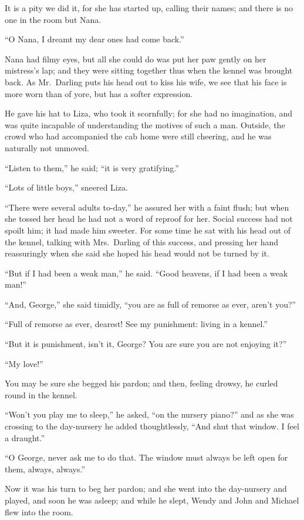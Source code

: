It is a pity we did it, for she has started up, calling their names;
and there is no one in the room but Nana.

``O Nana, I dreamt my dear ones had come back.''

Nana had filmy eyes, but all she could do was put her paw gently on her
mistress's lap; and they were sitting together thus when the kennel was
brought back. As Mr.\ Darling puts his head out to kiss his wife, we see
that his face is more worn than of yore, but has a softer expression.

He gave his hat to Liza, who took it scornfully; for she had no
imagination, and was quite incapable of understanding the motives of
such a man. Outside, the crowd who had accompanied the cab home were
still cheering, and he was naturally not unmoved.

``Listen to them,'' he said; ``it is very gratifying.''

``Lots of little boys,'' sneered Liza.

``There were several adults to-day,'' he assured her with a faint flush;
but when she tossed her head he had not a word of reproof for her.
Social success had not spoilt him; it had made him sweeter. For some
time he sat with his head out of the kennel, talking with Mrs.\ Darling
of this success, and pressing her hand reassuringly when she said she
hoped his head would not be turned by it.

``But if I had been a weak man,'' he said. ``Good heavens, if I had been a
weak man!''

``And, George,'' she said timidly, ``you are as full of remorse as ever,
aren't you?''

``Full of remorse as ever, dearest! See my punishment: living in a
kennel.''

``But it is punishment, isn't it, George? You are sure you are not
enjoying it?''

``My love!''

You may be sure she begged his pardon; and then, feeling drowsy, he
curled round in the kennel.

``Won't you play me to sleep,'' he asked, ``on the nursery piano?'' and as
she was crossing to the day-nursery he added thoughtlessly, ``And shut
that window. I feel a draught.''

``O George, never ask me to do that. The window must always be left open
for them, always, always.''

Now it was his turn to beg her pardon; and she went into the
day-nursery and played, and soon he was asleep; and while he slept,
Wendy and John and Michael flew into the room.

